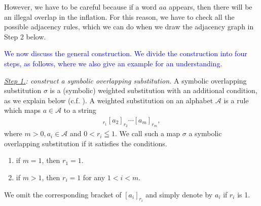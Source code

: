 \documentclass[a4]{amsart}
\theoremstyle{definition}
\begin{document}
However, we have to be careful because if a word $aa$ appears, then there will be an illegal overlap in the inflation. For this reason, we have to check all the possible adjacency rules, which we can do when we draw the adjacency graph in Step 2 below.

\textcolor{blue}{We now discuss the general construction. We divide the construction into four steps,
as follows, where we also give an example for an understanding.}

\emph{\underline{Step 1.}: construct a symbolic overlapping substitution.}
{\color{blue}A symbolic overlapping substitution $\sigma$ is a (symbolic) weighted substitution
 with an additional condition, as we explain below} (c.f. \cite{Kamae:05}).
 A weighted substitution on an alphabet
 $\mathcal{A}$ is a rule which maps
 $a\in\mathcal{A}$ to a string
 \begin{align*}
     [a_1]_{r_1}[a_2]_{r_2}\cdots [a_{m}]_{r_{m}},
 \end{align*}
 where $m>0, a_i\in\mathcal{A}$ and
 $0<r_i\leqq 1$.
We call such a map $\sigma$ a
symbolic overlapping substitution
if it satisfies the conditions.
\begin{enumerate}
    \item if $m=1$, then $r_1=1$.
    \item if $m>1$, then $r_i=1$ for any $1<i<m$.
\end{enumerate}
We omit the corresponding bracket of $[a_i]_{r_i}$ and simply denote by $a_i$  if $r_i$ is 1.
\end{document}
